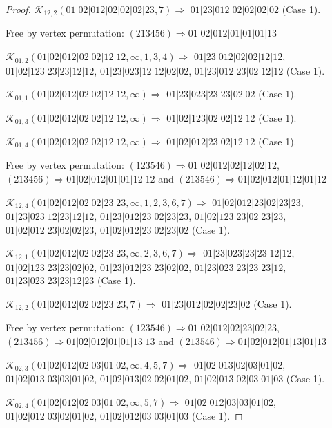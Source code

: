 \documentclass[12pt]{article}
\theoremstyle{plain}
\theoremstyle{definition}
\theoremstyle{remark}
\newcommand{\fancy}[1]{\mathcal{#1}}
\def\K{\fancy{K}}
\begin{document}
\begin{proof}
	$\K_{12,2}(01|02|012|02|02|02|23,7)\Rightarrow $ $01|23|012|02|02|02|02$ (Case 1).
	
	
	
	Free by vertex permutation: $(2 1 3 4 5 6)\Rightarrow 01|02|012|01|01|01|13$
	
	
	
	\bigskip
	
	$\K_{01,2}(01|02|012|02|02|12|12,\infty,1, 3, 4)\Rightarrow $ $01|23|012|02|02|12|12$, $01|02|123|23|23|12|12$, $01|23|023|12|12|02|02$, $01|23|012|23|02|12|12$ (Case 1).
	
	$\K_{01,1}(01|02|012|02|02|12|12,\infty)\Rightarrow $ $01|23|023|23|23|02|02$ (Case 1).
	
	$\K_{01,3}(01|02|012|02|02|12|12,\infty)\Rightarrow $ $01|02|123|02|02|12|12$ (Case 1).
	
	$\K_{01,4}(01|02|012|02|02|12|12,\infty)\Rightarrow $ $01|02|012|23|02|12|12$ (Case 1).
	
	
	
	Free by vertex permutation: $(1 2 3 5 4 6)\Rightarrow 01|02|012|02|12|02|12$, $(2 1 3 4 5 6)\Rightarrow 01|02|012|01|01|12|12$ and $(2 1 3 5 4 6)\Rightarrow 01|02|012|01|12|01|12$
	
	
	
	\bigskip
	
	$\K_{12,4}(01|02|012|02|02|23|23,\infty,1, 2, 3, 6, 7)\Rightarrow $ $01|02|012|23|02|23|23$, $01|23|023|12|23|12|12$, $01|23|012|23|02|23|23$, $01|02|123|23|02|23|23$, $01|02|012|23|02|02|23$, $01|02|012|23|02|23|02$ (Case 1).
	
	$\K_{12,1}(01|02|012|02|02|23|23,\infty,2, 3, 6, 7)\Rightarrow $ $01|23|023|23|23|12|12$, $01|02|123|23|23|02|02$, $01|23|012|23|23|02|02$, $01|23|023|23|23|23|12$, $01|23|023|23|23|12|23$ (Case 1).
	
	$\K_{12,2}(01|02|012|02|02|23|23,7)\Rightarrow $ $01|23|012|02|02|23|02$ (Case 1).
	
	
	
	Free by vertex permutation: $(1 2 3 5 4 6)\Rightarrow 01|02|012|02|23|02|23$, $(2 1 3 4 5 6)\Rightarrow 01|02|012|01|01|13|13$ and $(2 1 3 5 4 6)\Rightarrow 01|02|012|01|13|01|13$
	
	
	
	\bigskip
	
	$\K_{02,3}(01|02|012|02|03|01|02,\infty,4, 5, 7)\Rightarrow $ $01|02|013|02|03|01|02$, $01|02|013|03|03|01|02$, $01|02|013|02|02|01|02$, $01|02|013|02|03|01|03$ (Case 1).
	
	$\K_{02,4}(01|02|012|02|03|01|02,\infty,5, 7)\Rightarrow $ $01|02|012|03|03|01|02$, $01|02|012|03|02|01|02$, $01|02|012|03|03|01|03$ (Case 1).
	

\end{proof}
\end{document}
